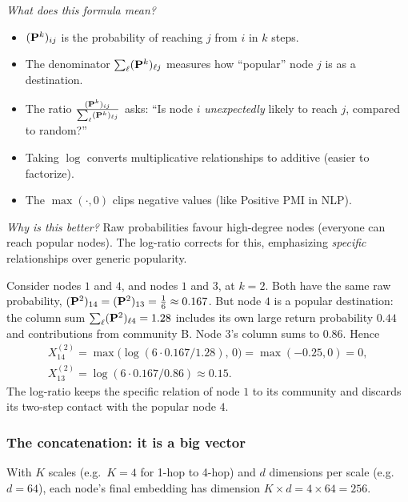 \begin{notechapter}
\begin{intuition}
\emph{What does this formula mean?}

\begin{itemize}
    \item $(\mathbf{P}^k)_{ij}$ is the probability of reaching $j$ from $i$ in $k$ steps.
    \item The denominator $\sum_{\ell} (\mathbf{P}^k)_{\ell j}$ measures how ``popular'' node $j$ is as a destination.
    \item The ratio $\frac{(\mathbf{P}^k)_{ij}}{\sum_{\ell} (\mathbf{P}^k)_{\ell j}}$ asks: ``Is node $i$ \emph{unexpectedly} likely to reach $j$, compared to random?''
    \item Taking $\log$ converts multiplicative relationships to additive (easier to factorize).
    \item The $\max(\cdot, 0)$ clips negative values (like Positive PMI in NLP).
\end{itemize}

\emph{Why is this better?} Raw probabilities favour high-degree nodes (everyone can reach popular nodes). The log-ratio corrects for this, emphasizing \emph{specific} relationships over generic popularity.
\end{intuition}

\begin{example}
Consider nodes $1$ and $4$, and nodes $1$ and $3$, at $k = 2$. Both have the same raw probability, $(\mathbf{P}^2)_{14} = (\mathbf{P}^2)_{13} = \frac16 \approx 0.167$. But node $4$ is a popular destination: the column sum $\sum_\ell(\mathbf{P}^2)_{\ell4} = 1.28$ includes its own large return probability $0.44$ and contributions from community B. Node $3$'s column sums to $0.86$. Hence
\begin{gather*}
X^{(2)}_{14} = \max\bigl(\log(6\cdot0.167/1.28),\,0\bigr) = \max(-0.25, 0) = 0, \\
X^{(2)}_{13} = \log(6\cdot0.167/0.86) \approx 0.15 .
\end{gather*}
The log-ratio keeps the specific relation of node $1$ to its community and discards its two-step contact with the popular node $4$.
\end{example}

\subsubsection*{The concatenation: it is a big vector}

\begin{keyidea}
With $K$ scales (e.g.\ $K = 4$ for 1-hop to 4-hop) and $d$ dimensions per scale (e.g.\ $d = 64$), each node's final embedding has dimension $K \times d = 4 \times 64 = 256$.


\end{keyidea}
\end{notechapter}
